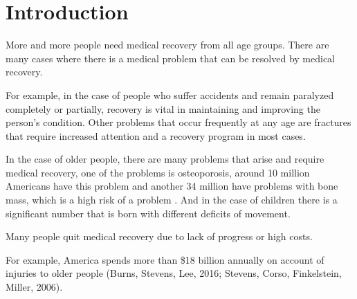 \chapter{Introduction}

More and more people need medical recovery from all age groups.
There are many cases where there is a medical problem that can be resolved by medical recovery.


For example, in the case of people who suffer accidents and remain paralyzed completely or partially, 
recovery is vital in maintaining and improving the person's condition.
Other problems that occur frequently at any age are fractures that require increased attention 
and a recovery program in most cases.


In the case of older people, there are many problems that arise and
require medical recovery, one of the problems is osteoporosis,
around 10 million Americans have this problem and another 34 million have problems with bone mass, 
which is a high risk of a problem \cite{keen2003burden}.
And in the case of children there is a significant number that is born with different deficits of movement.

Many people quit medical recovery due to lack of progress or high costs.

For example, America spends more than \$18 billion annually on account of injuries to older people
(Burns, Stevens, Lee, 2016; Stevens, Corso, Finkelstein,  Miller, 2006).

